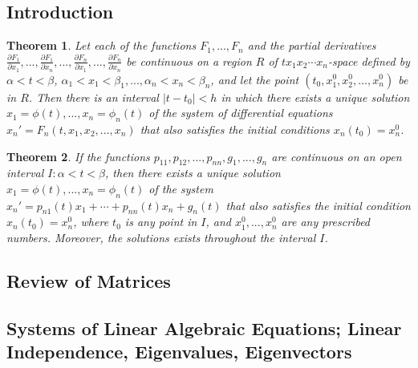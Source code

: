 \documentclass[10pt]{report}
\newtheorem{thm3}{Theorem}[subsection]
\begin{document}
\subsection{Introduction}
\begin{thm3}
Let each of the functions $F_1,...,F_n$ and the partial derivatives $\frac{\partial F_1}{\partial x_1},...,\frac{\partial F_1}{\partial x_n},...,\frac{\partial F_n}{\partial x_1},...,\frac{\partial F_n}{\partial x_n}$ be continuous on a region $R$ of $t x_1 x_2\cdots x_n$-space defined by $\alpha < t < \beta$, $\alpha_1 < x_1 <\beta_1 ,..., \alpha_n < x_n < \beta_n$, and let the point $(t_0, x_1^0, x_2^0,..., x_n^0)$ be in $R$. Then there is an interval $|t-t_0| < h$ in which there exists a unique solution $x_1 = \phi(t) ,..., x_n = \phi_n (t)$ of the system of differential equations $x_n' = F_n(t,x_1,x_2,...,x_n)$ that also satisfies the initial conditions $x_n(t_0)=x_n^0$.
\end{thm3}
\begin{thm3}
If the functions $p_{11},p_{12},...,p_{nn},g_1,...,g_n$ are continuous on an open interval $I:\alpha<t<\beta$, then there exists a unique solution $x_1=\phi(t),...,x_n=\phi_n(t)$ of the system $x_n'=p_{n1}(t)x_1 + \cdots + p_{nn}(t)x_n + g_n(t)$ that also satisfies the initial condition $x_n(t_0)=x_n^0$, where $t_0$ is any point in $I$, and $x_1^0,...,x_n^0$ are any prescribed numbers. Moreover, the solutions exists throughout the interval $I$.
\end{thm3}
\subsection{Review of Matrices}
\subsection{Systems of Linear Algebraic Equations; Linear Independence, Eigenvalues, Eigenvectors}
\end{document}
